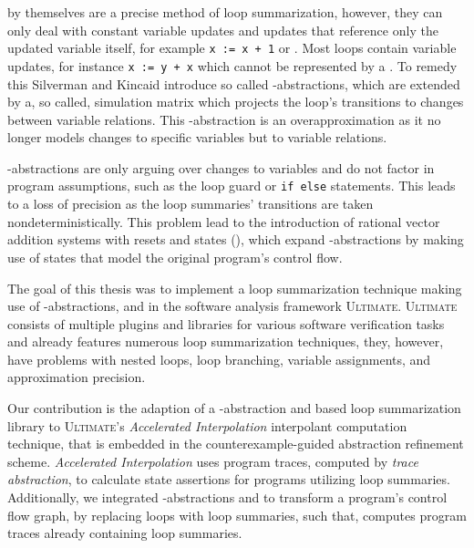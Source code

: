 \qvasr by themselves are a precise method of loop summarization, however, they can only deal with constant variable updates and updates that reference only the updated variable itself, for example \texttt{x := x + 1} or . Most loops contain variable updates, for instance \texttt{x := y + x} which cannot be represented by a \qvasr. To remedy this Silverman and Kincaid introduce so called \qvasr-abstractions, which are \qvasr extended by a, so called, simulation matrix which projects the loop's transitions to changes between variable relations. This \qvasr-abstraction is an overapproximation as it no longer models changes to specific variables but to variable relations.\\ \par

\qvasr-abstractions are only arguing over changes to variables and do not factor in program assumptions, such as the loop guard or \texttt{if else} statements. This leads to a loss of precision as the loop summaries' transitions are taken nondeterministically. This problem lead to the introduction of rational vector addition systems with resets and states (\qvasr), which expand \qvasr-abstractions by making use of states that model the original program's control flow.\\ \par

The goal of this thesis was to implement a loop summarization technique making use of \qvasr-abstractions, and \qvasrs in the software analysis framework \textsc{Ultimate}\cite{Zitat02}.
\textsc{Ultimate} consists of multiple plugins and libraries for various software verification tasks and already features numerous loop summarization techniques, they, however, have problems with nested loops, loop branching, variable assignments, and approximation precision.\\  \par
Our contribution is the adaption of a \qvasr-abstraction and \qvasrs based loop summarization library to \textsc{Ultimate}'s \textsl{Accelerated Interpolation} interpolant computation technique, that is embedded in the \traceabstraction \cite{10.1007/978-3-642-03237-0_7} counterexample-guided abstraction refinement scheme. \textsl{Accelerated Interpolation} uses program traces, computed by \textsl{trace abstraction}, to calculate state assertions for programs utilizing loop summaries. Additionally, we integrated \qvasr-abstractions and \qvasrs to transform a program's control flow graph, by replacing loops with loop summaries, such that, \traceabstraction computes program traces already containing loop summaries.\\ \par

